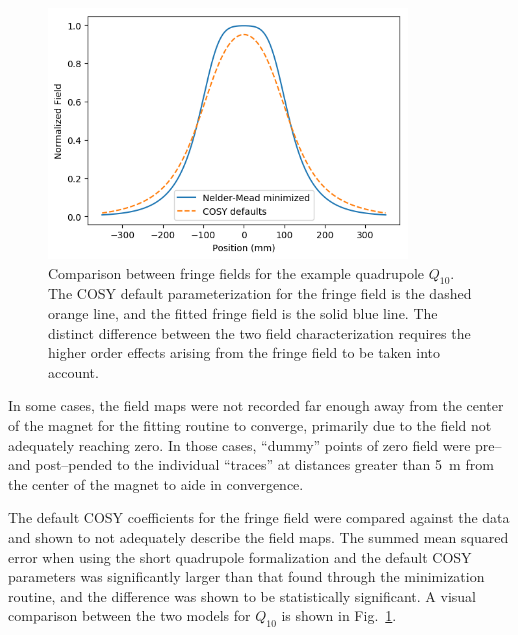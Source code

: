 \begin{figure}[t]
    \begin{center}
        \centerline{
            \includegraphics[width=0.85\textwidth]{figures/enge_comparison.png}}
        \caption[Comparison between fringe fields]{Comparison between
            fringe fields for the example quadrupole $Q_{10}$. The COSY
            default parameterization for the fringe field is the dashed
            orange line, and the fitted fringe field is the solid blue
            line. The distinct difference between the two field
            characterization requires the higher order effects arising
            from the fringe field to be taken into account.}
        \label{fig:enge_comparison}
    \end{center}
\end{figure}

In some cases, the field maps were not recorded far enough away from the
center of the magnet for the fitting routine to converge, primarily due
to the field not adequately reaching zero. In those cases, ``dummy''
points of zero field were pre\---{} and post\---{}pended to the
individual ``traces'' at distances greater than 5~m from the center of
the magnet to aide in convergence.

The default COSY coefficients for the fringe field were compared against
the data and shown to not adequately describe the field maps. The summed
mean squared error when using the short quadrupole formalization and the
default COSY parameters was significantly larger than that found through
the minimization routine, and the difference was shown to be
statistically significant. A visual comparison between the two models
for $Q_{10}$ is shown in Fig.~\ref{fig:enge_comparison}.

